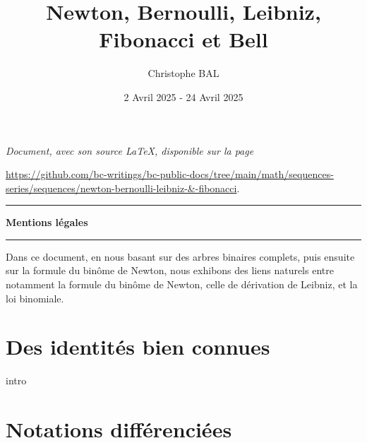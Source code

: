 \documentclass[12pt]{amsart}
\begin{document}
\title{Newton, Bernoulli, Leibniz, Fibonacci et Bell}
\author{Christophe BAL}
\date{2 Avril 2025 - 24 Avril 2025}

\maketitle

\begin{center}
	\itshape
	Document, avec son source \LaTeX, disponible sur la page

	\url{https://github.com/bc-writings/bc-public-docs/tree/main/math/sequences-series/sequences/newton-bernoulli-leibniz-&-fibonacci}.
\end{center}


\bigskip


\begin{center}
	\hrule\vspace{.3em}
	{
		\fontsize{1.35em}{1em}\selectfont
		\textbf{Mentions \og légales \fg}
	}

	\vspace{0.45em}
	\doclicenseThis
	\hrule
\end{center}


\bigskip


\setcounter{tocdepth}{2}
\tableofcontents




\newpage

\begin{meta-abstract*}
	Dans ce document, en nous basant
	sur des arbres binaires complets,
	puis ensuite
	sur la formule du binôme de Newton,
	nous exhibons des liens naturels entre notamment
	la formule du binôme de Newton,
	celle de dérivation de Leibniz,
	et la loi binomiale.
\end{meta-abstract*}




\section{Des identités bien connues} \label{beautiful-id}

{intro}




\section{Notations différenciées}
\end{document}
